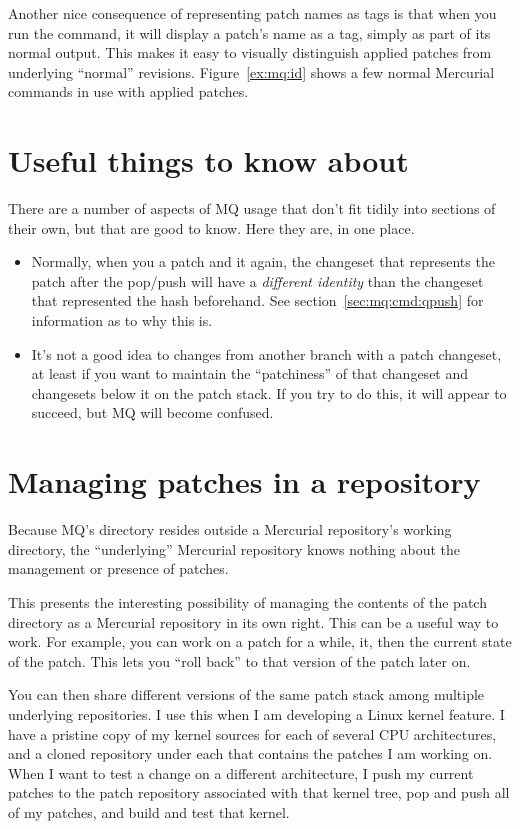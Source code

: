 Another nice consequence of representing patch names as tags is that
when you run the  command, it will display a patch's name
as a tag, simply as part of its normal output.  This makes it easy to
visually distinguish applied patches from underlying ``normal''
revisions.  Figure~\ref{ex:mq:id} shows a few normal Mercurial
commands in use with applied patches.

\section{Useful things to know about}

There are a number of aspects of MQ usage that don't fit tidily into
sections of their own, but that are good to know.  Here they are, in
one place.

\begin{itemize}
\item Normally, when you  a patch and  it
  again, the changeset that represents the patch after the pop/push
  will have a \emph{different identity} than the changeset that
  represented the hash beforehand.  See section~\ref{sec:mq:cmd:qpush}
  for information as to why this is.
\item It's not a good idea to  changes from another
  branch with a patch changeset, at least if you want to maintain the
  ``patchiness'' of that changeset and changesets below it on the
  patch stack.  If you try to do this, it will appear to succeed, but
  MQ will become confused.
\end{itemize}

\section{Managing patches in a repository}

Because MQ's  directory resides outside a
Mercurial repository's working directory, the ``underlying'' Mercurial
repository knows nothing about the management or presence of patches.

This presents the interesting possibility of managing the contents of
the patch directory as a Mercurial repository in its own right.  This
can be a useful way to work.  For example, you can work on a patch for
a while,  it, then  the current state of
the patch.  This lets you ``roll back'' to that version of the patch
later on.

You can then share different versions of the same patch stack among
multiple underlying repositories.  I use this when I am developing a
Linux kernel feature.  I have a pristine copy of my kernel sources for
each of several CPU architectures, and a cloned repository under each
that contains the patches I am working on.  When I want to test a
change on a different architecture, I push my current patches to the
patch repository associated with that kernel tree, pop and push all of
my patches, and build and test that kernel.

